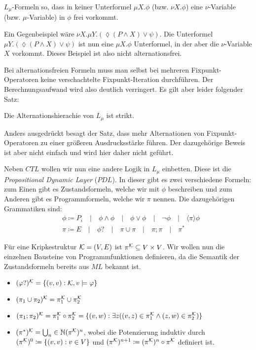 \begin{definition}
	$L_\mu$-Formeln so, dass in keiner Unterformel $\mu X.\phi$ (bzw. $\nu X .\phi$) eine $\nu$-Variable (bzw. $\mu$-Variable) in $\phi$ frei vorkommt.
\end{definition}

Ein Gegenbeispiel wäre $\nu X.\mu Y.(\lozenge(P\land X) \lor \psi)$. Die Unterformel $\mu Y.(\lozenge(P\land X) \lor \psi)$ ist nun eine $\mu X.\phi$ Unterformel, in der aber die $\nu$-Variable $X$ vorkommt. Dieses Beispiel ist also nicht alternationsfrei.

Bei alternationsfreien Formeln muss man selbst bei mehreren Fixpunkt-Operatoren keine verschachtelte Fixpunkt-Iteration durchführen. Der Berechnungsaufwand wird also deutlich verringert. Es gilt aber leider folgender Satz:

\begin{satz}
	Die Alternationshierachie von $L_\mu$ ist strikt.
\end{satz}

Anders ausgedrückt besagt der Satz, dass mehr Alternationen von Fixpunkt-Operatoren zu einer größeren Ausdrucksstärke führen. Der dazugehörige Beweis ist aber nicht einfach und wird hier daher nicht geführt.

Neben $CTL$ wollen wir nun eine andere Logik in $L_\mu$ einbetten. Diese ist die \textit{Propositional Dynamic Layer} ($PDL$). In dieser gibt es zwei verschiedene Formeln: zum Einen gibt es Zustandsformeln, welche wir mit $\phi$ beschreiben und zum Anderen gibt es Programmformeln, welche wir $\pi$ nennen. Die dazugehörigen Grammatiken sind:
\begin{align*}
	&\phi \coloneqq P_i \quad\vert\quad \phi\land\phi \quad\vert\quad \phi\lor\phi \quad\vert\quad \neg\phi \quad\vert\quad \langle\pi\rangle\phi \\
	&\pi \coloneqq E \quad\vert\quad \phi? \quad\vert\quad \pi\cup\pi \quad\vert\quad \pi;\pi \quad\vert\quad \pi^\ast
\end{align*}

Für eine Kripkestruktur $\mathcal{K}=(V,E)$ ist $\pi^{\mathcal{K}}\subseteq V\times V$. Wir wollen nun die einzelnen Bausteine von Programmfunktionen definieren, da die Semantik der Zustandsformeln bereits aus $ML$ bekannt ist.
\begin{itemize}
	\item $(\varphi?)^{\mathcal{K}}=\{(v,v):\mathcal{K},v\models \varphi\}$
	\item $(\pi_1 \cup \pi_2)^{\mathcal{K}} = \pi_1^{\mathcal{K}} \cup \pi_2^{\mathcal{K}}$
	\item $(\pi_1;\pi_2)^{\mathcal{K}} = \pi_1^{\mathcal{K}} \circ \pi_2^{\mathcal{K}} = \{(v,w) : \exists z ((v,z)\in \pi_1^{\mathcal{K}} \land (z,w)\in \pi_2^{\mathcal{K}})\}$
	\item $(\pi^\ast)^{\mathcal{K}}=\bigcup_n\in\mathbb{N} (\pi^{\mathcal{K}})^n$, wobei die Potenzierung induktiv durch $(\pi^{\mathcal{K}})^0\coloneqq\{(v,v):v\in V\}$ und $(\pi^{\mathcal{K}})^{n+1}\coloneqq(\pi^{\mathcal{K}})^n \circ \pi^{\mathcal{K}}$ definiert ist.
\end{itemize}

